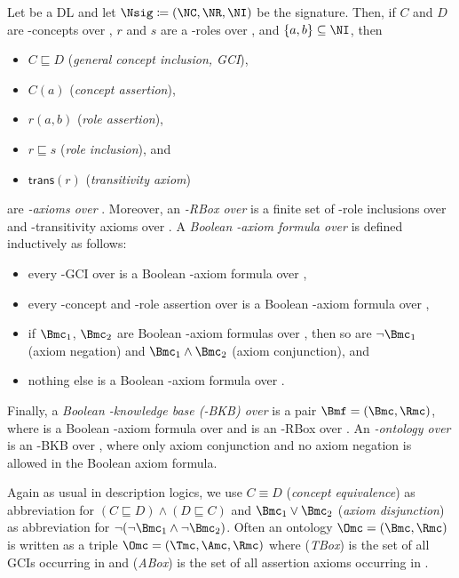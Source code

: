 \begin{definition}
  Let \Lmc be a DL and
  let $\Nsig\coloneqq(\NC,\NR,\NI)$ be the signature. Then, if $C$ and $D$ are \Lmc-concepts over \Nsig, $r$
  and $s$ are a \Lmc-roles over \Nsig, and $\{a,b\}\subseteq\NI$, then
  \begin{itemize}
  \item $C \sqsubseteq D$ (\emph{general concept inclusion, GCI}),
  \item $C(a)$ (\emph{concept assertion}),
  \item $r(a,b)$ (\emph{role assertion}),
  \item $r \sqsubseteq s$ (\emph{role inclusion}), and
  \item $\mathsf{trans}(r)$ (\emph{transitivity axiom})
  \end{itemize}
  are \emph{\Lmc-axioms over \Nsig}.
  Moreover, an \emph{\Lmc-RBox \Rmc over \Nsig} is a finite set of \Lmc-role inclusions over \Nsig and
  \Lmc-transitivity axioms over \Nsig. A \emph{Boolean \Lmc-axiom formula over \Nsig} is defined inductively
  as follows:
  \begin{itemize}
  \item every \Lmc-GCI over \Nsig is a Boolean \Lmc-axiom formula over \Nsig,
  \item every \Lmc-concept and \Lmc-role assertion over \Nsig is a Boolean \Lmc-axiom formula over \Nsig,
  \item if $\Bmc_{1}$, $\Bmc_{2}$ are Boolean \Lmc-axiom formulas over \Nsig, then so are $\lnot\Bmc_{1}$
    (axiom negation) and $\Bmc_{1}\land\Bmc_{2}$ (axiom conjunction), and
  \item nothing else is a Boolean \Lmc-axiom formula over \Nsig.
  \end{itemize}
  Finally, a \emph{Boolean \Lmc-knowledge base (\Lmc-BKB) over \Nsig} is a pair
  $\Bmf = (\Bmc, \Rmc)$, where \Bmc is a Boolean \Lmc-axiom formula over \Nsig and \Rmc is an
  \Lmc-RBox over \Nsig. An \emph{\Lmc-ontology over \Nsig} is an \Lmc-BKB over \Nsig, where only
  axiom conjunction and no axiom negation is allowed in the Boolean axiom formula.
\end{definition}

\noindent
Again as usual in description logics, we use $C \equiv D$ (\emph{concept equivalence}) as abbreviation
for $(C \sqsubseteq D) \land (D \sqsubseteq C)$ and $\Bmc_1\lor\Bmc_2$ (\emph{axiom disjunction}) as
abbreviation for $\lnot(\lnot\Bmc_1\land\lnot\Bmc_2)$.
%
Often an ontology $\Omc = (\Bmc, \Rmc)$ is written as a triple $\Omc = (\Tmc, \Amc, \Rmc)$ where
\Tmc (\emph{TBox}) is the set of all GCIs occurring in \Bmc and \Amc (\emph{ABox}) is the set of all
assertion axioms occurring in \Bmc.


